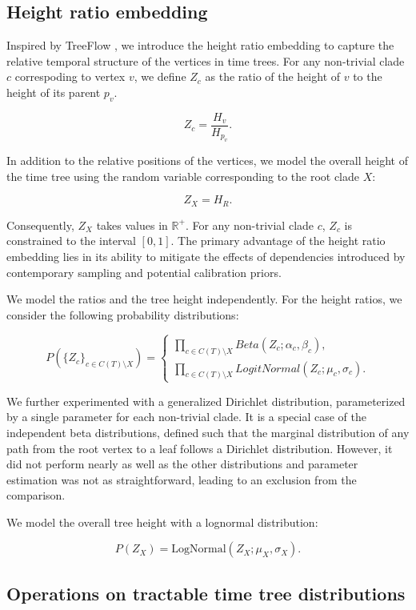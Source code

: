 \documentclass[10pt,letterpaper]{article}
\begin{document}
\subsection*{Height ratio embedding}

Inspired by TreeFlow \cite{treeflow}, we introduce the height ratio embedding to capture the relative temporal structure of the vertices in time trees. For any non-trivial clade $c$ correspoding to vertex $v$, we define $Z_c$ as the ratio of the height of $v$ to the height of its parent $p_v$.

$$
Z_c = \frac{H_v}{H_{p_v}}.
$$

In addition to the relative positions of the vertices, we model the overall height of the time tree using the random variable corresponding to the root clade $X$:

$$
Z_X = H_R.
$$

Consequently, $Z_X$ takes values in $\mathbb{R}^+$. For any non-trivial clade $c$, $Z_c$ is constrained to the interval $[0, 1]$. The primary advantage of the height ratio embedding lies in its ability to mitigate the effects of dependencies introduced by contemporary sampling and potential calibration priors.

We model the ratios and the tree height independently. For the height ratios, we consider the following probability distributions:

$$
P(\{Z_c\}_{c \in C(T) \setminus X}) = \begin{cases}
	\prod_{c \in C(T) \setminus X}{Beta(Z_c; \alpha_c, \beta_c)}, \\
	\prod_{c \in C(T) \setminus X}{LogitNormal(Z_c; \mu_c, \sigma_c)}.
\end{cases}
$$

We further experimented with a generalized Dirichlet distribution, parameterized by a single parameter for each non-trivial clade. It is a special case of the independent beta distributions, defined such that the marginal distribution of any path from the root vertex to a leaf follows a Dirichlet distribution. However, it did not perform nearly as well as the other distributions and parameter estimation was not as straightforward, leading to an exclusion from the comparison.

We model the overall tree height with a lognormal distribution:

$$
P(Z_X) = \text{LogNormal}(Z_X; \mu_X, \sigma_X).
$$

\subsection*{Operations on tractable time tree distributions}
\end{document}
